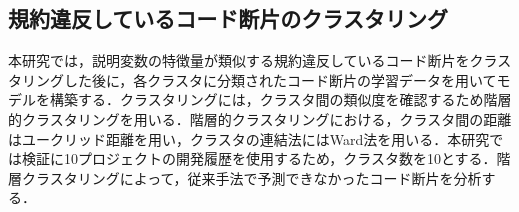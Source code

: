 \documentclass[T,J]{fose} %
\newcommand{\todo}[1]{\colorbox{yellow}{{\bf TODO}:}{\color{red} {\textbf{[#1]}}}}
\begin{document}




\newpage
\subsection{規約違反しているコード断片のクラスタリング}

本研究では，説明変数の特徴量が類似する規約違反しているコード断片をクラスタリングした後に，各クラスタに分類されたコード断片の学習データを用いてモデルを構築する．クラスタリングには，クラスタ間の類似度を確認するため階層的クラスタリングを用いる．階層的クラスタリングにおける，クラスタ間の距離はユークリッド距離を用い，クラスタの連結法にはWard法を用いる．本研究では検証に10プロジェクトの開発履歴を使用するため，クラスタ数を10とする．階層クラスタリングによって，従来手法で予測できなかったコード断片を分析する．
\end{document}
